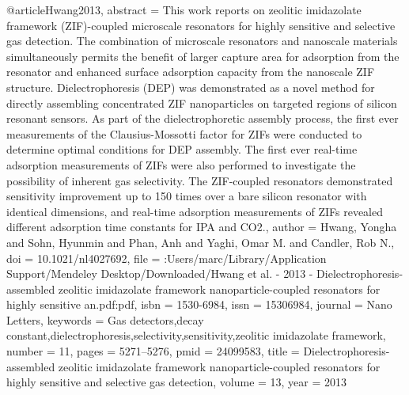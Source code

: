 @article{Hwang2013,
abstract = {This work reports on zeolitic imidazolate framework (ZIF)-coupled microscale resonators for highly sensitive and selective gas detection. The combination of microscale resonators and nanoscale materials simultaneously permits the benefit of larger capture area for adsorption from the resonator and enhanced surface adsorption capacity from the nanoscale ZIF structure. Dielectrophoresis (DEP) was demonstrated as a novel method for directly assembling concentrated ZIF nanoparticles on targeted regions of silicon resonant sensors. As part of the dielectrophoretic assembly process, the first ever measurements of the Clausius-Mossotti factor for ZIFs were conducted to determine optimal conditions for DEP assembly. The first ever real-time adsorption measurements of ZIFs were also performed to investigate the possibility of inherent gas selectivity. The ZIF-coupled resonators demonstrated sensitivity improvement up to 150 times over a bare silicon resonator with identical dimensions, and real-time adsorption measurements of ZIFs revealed different adsorption time constants for IPA and CO2.},
author = {Hwang, Yongha and Sohn, Hyunmin and Phan, Anh and Yaghi, Omar M. and Candler, Rob N.},
doi = {10.1021/nl4027692},
file = {:Users/marc/Library/Application Support/Mendeley Desktop/Downloaded/Hwang et al. - 2013 - Dielectrophoresis-assembled zeolitic imidazolate framework nanoparticle-coupled resonators for highly sensitive an.pdf:pdf},
isbn = {1530-6984},
issn = {15306984},
journal = {Nano Letters},
keywords = {Gas detectors,decay constant,dielectrophoresis,selectivity,sensitivity,zeolitic imidazolate framework},
number = {11},
pages = {5271--5276},
pmid = {24099583},
title = {{Dielectrophoresis-assembled zeolitic imidazolate framework nanoparticle-coupled resonators for highly sensitive and selective gas detection}},
volume = {13},
year = {2013}
}

